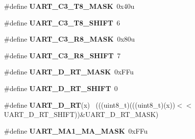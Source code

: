 \begin{DoxyCompactItemize}
\item 
\hypertarget{group___u_a_r_t___register___masks_gaec915ed2882cf21feb385399e44b5a9b}{}\#define {\bfseries U\+A\+R\+T\+\_\+\+C3\+\_\+\+T8\+\_\+\+M\+A\+S\+K}~0x40u\label{group___u_a_r_t___register___masks_gaec915ed2882cf21feb385399e44b5a9b}

\item 
\hypertarget{group___u_a_r_t___register___masks_ga98e310521d3edf56770be85701a65142}{}\#define {\bfseries U\+A\+R\+T\+\_\+\+C3\+\_\+\+T8\+\_\+\+S\+H\+I\+F\+T}~6\label{group___u_a_r_t___register___masks_ga98e310521d3edf56770be85701a65142}

\item 
\hypertarget{group___u_a_r_t___register___masks_gae17bda6e18ad786d2cedf0105976d9dc}{}\#define {\bfseries U\+A\+R\+T\+\_\+\+C3\+\_\+\+R8\+\_\+\+M\+A\+S\+K}~0x80u\label{group___u_a_r_t___register___masks_gae17bda6e18ad786d2cedf0105976d9dc}

\item 
\hypertarget{group___u_a_r_t___register___masks_gab1799b4eb595a66cc5995e206e001f78}{}\#define {\bfseries U\+A\+R\+T\+\_\+\+C3\+\_\+\+R8\+\_\+\+S\+H\+I\+F\+T}~7\label{group___u_a_r_t___register___masks_gab1799b4eb595a66cc5995e206e001f78}

\item 
\hypertarget{group___u_a_r_t___register___masks_gabb8507803e62ff2f8cc3a3c7f9fc43c2}{}\#define {\bfseries U\+A\+R\+T\+\_\+\+D\+\_\+\+R\+T\+\_\+\+M\+A\+S\+K}~0x\+F\+Fu\label{group___u_a_r_t___register___masks_gabb8507803e62ff2f8cc3a3c7f9fc43c2}

\item 
\hypertarget{group___u_a_r_t___register___masks_ga045cb82177942d68eb711a61ee412768}{}\#define {\bfseries U\+A\+R\+T\+\_\+\+D\+\_\+\+R\+T\+\_\+\+S\+H\+I\+F\+T}~0\label{group___u_a_r_t___register___masks_ga045cb82177942d68eb711a61ee412768}

\item 
\hypertarget{group___u_a_r_t___register___masks_ga4f5ba4e9a327cd6730693568463e8d67}{}\#define {\bfseries U\+A\+R\+T\+\_\+\+D\+\_\+\+R\+T}(x)                                                      ~(((uint8\+\_\+t)(((uint8\+\_\+t)(x))$<$$<$U\+A\+R\+T\+\_\+\+D\+\_\+\+R\+T\+\_\+\+S\+H\+I\+F\+T))\&U\+A\+R\+T\+\_\+\+D\+\_\+\+R\+T\+\_\+\+M\+A\+S\+K)\label{group___u_a_r_t___register___masks_ga4f5ba4e9a327cd6730693568463e8d67}

\item 
\hypertarget{group___u_a_r_t___register___masks_gaa4fe1e60d0ca635fd633af77c3b63998}{}\#define {\bfseries U\+A\+R\+T\+\_\+\+M\+A1\+\_\+\+M\+A\+\_\+\+M\+A\+S\+K}~0x\+F\+Fu\label{group___u_a_r_t___register___masks_gaa4fe1e60d0ca635fd633af77c3b63998}


\end{DoxyCompactItemize}
